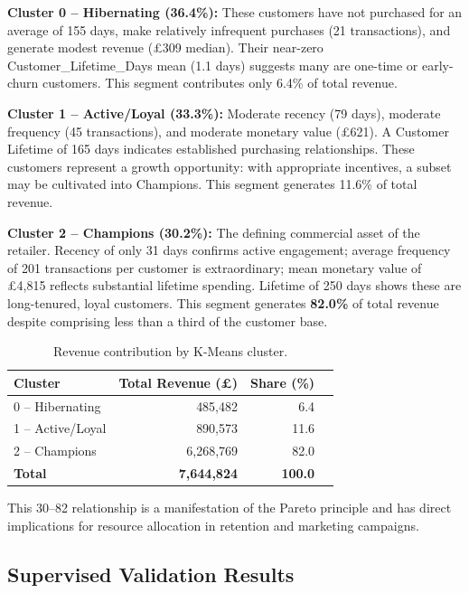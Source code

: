 \documentclass[10pt,a4paper]{article}
\begin{document}
\textbf{Cluster 0 -- Hibernating (36.4\%):} These customers have not purchased for
an average of 155 days, make relatively infrequent purchases (21 transactions), and
generate modest revenue (\pounds309 median).  Their near-zero Customer\_Lifetime\_Days
mean (1.1 days) suggests many are one-time or early-churn customers.  This segment
contributes only 6.4\% of total revenue.

\textbf{Cluster 1 -- Active/Loyal (33.3\%):} Moderate recency (79 days), moderate
frequency (45 transactions), and moderate monetary value (\pounds621).  A Customer
Lifetime of 165 days indicates established purchasing relationships.  These customers
represent a growth opportunity: with appropriate incentives, a subset may be
cultivated into Champions.  This segment generates 11.6\% of total revenue.

\textbf{Cluster 2 -- Champions (30.2\%):} The defining commercial asset of the
retailer.  Recency of only 31 days confirms active engagement; average frequency
of 201 transactions per customer is extraordinary; mean monetary value of \pounds4,815
reflects substantial lifetime spending.  Lifetime of 250 days shows these are
long-tenured, loyal customers.  This segment generates \textbf{82.0\%} of total
revenue despite comprising less than a third of the customer base.

\begin{table}[H]
  \centering
  \caption{Revenue contribution by K-Means cluster.}
  \label{tab:revenue}
  \begin{tabular}{lrrr}
    \toprule
    \textbf{Cluster} & \textbf{Total Revenue (\pounds)} & \textbf{Share (\%)} \\
    \midrule
    0 -- Hibernating  & 485,482   &  6.4 \\
    1 -- Active/Loyal & 890,573   & 11.6 \\
    2 -- Champions    & 6,268,769 & 82.0 \\
    \midrule
    \textbf{Total}    & \textbf{7,644,824} & \textbf{100.0} \\
    \bottomrule
  \end{tabular}
\end{table}

This 30--82 relationship is a manifestation of the Pareto principle and has direct
implications for resource allocation in retention and marketing campaigns.

\subsection{Supervised Validation Results}
\end{document}
